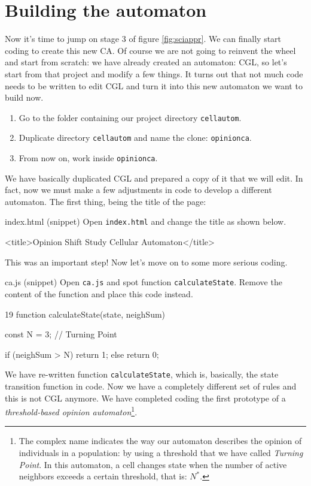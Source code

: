 \section{Building the automaton}
Now it's time to jump on stage 3 of figure \ref{fig:sciappr}. We can finally start coding to
create this new CA. Of course we are not going to reinvent the wheel and start from scratch: we
have already created an automaton: CGL, so let's start from that project and modify a few things.
It turns out that not much code needs to be written to edit CGL and turn it into this new
automaton we want to build now.

\begin{enumerate}
\item Go to the folder containing our project directory \texttt{cellautom}.
\item Duplicate directory \texttt{cellautom} and name the clone: \texttt{opinionca}.
\item From now on, work inside \texttt{opinionca}.
\end{enumerate}

We have basically duplicated CGL and prepared a copy of it that we will edit. In fact, now we must
make a few adjustments in code to develop a different automaton. The first thing, being the title
of the page:

\begin{programcode}{index.html (snippet)}
Open \texttt{index.html} and change the title as shown below.
\begin{codehtml}
<title>Opinion Shift Study Cellular Automaton</title>
\end{codehtml}
\end{programcode}

This was an important step! Now let's move on to some more serious coding.

\begin{programcode}{ca.js (snippet)}
Open \texttt{ca.js} and spot function \texttt{calculateState}. Remove the content of the
function and place this code instead.
\begin{codeh1}{1}{9}
function calculateState(state, neighSum) {
  const N = 3; // Turning Point

  if (neighSum > N) {
    return 1;
  } else {
    return 0;
  }
}
\end{codeh1}
\end{programcode}

We have re-written function \texttt{calculateState}, which is, basically, the state
transition function in code. Now we have a completely different set of rules and this is
not CGL anymore. We have completed coding the first prototype of a
\textit{threshold-based opinion automaton}\footnote{The complex name indicates the way
our automaton describes the opinion of individuals in a population: by using a threshold that we
have called \textit{Turning Point}. In this automaton, a cell changes state when the number
of active neighbors exceeds a certain threshold, that is: $N^\ast$.}.

